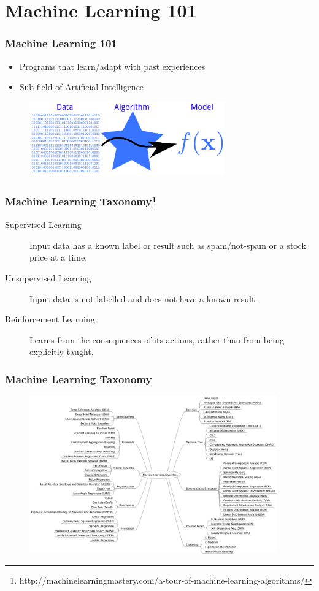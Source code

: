 \documentclass{beamer}
\begin{document}
\section{Machine Learning 101}
\begin{frame}
	\frametitle{Machine Learning 101}
	\begin{itemize}
		\item Programs that learn\slash adapt with past experiences
		\item Sub-field of Artificial Intelligence 
	\end{itemize}
	\begin{figure}
		\centering
		\includegraphics[keepaspectratio, width=0.75\textwidth]{graphics/steps}
	\end{figure}
\end{frame}

\begin{frame}
	\frametitle{Machine Learning Taxonomy\footnote[frame]{http://machinelearningmastery.com/a-tour-of-machine-learning-algorithms/}}
	\begin{description}
		\item[Supervised Learning] Input data has a known label or result such as spam\slash not-spam or a stock price at a time.
		\item[Unsupervised Learning] Input data is not labelled and does not have a known result.
		\item[Reinforcement Learning] Learns from the consequences of its actions, rather than from being explicitly taught. 
	\end{description}
\end{frame}

\begin{frame}
	\frametitle{Machine Learning Taxonomy}
	\begin{figure}
		\centering
		\includegraphics[keepaspectratio, width=0.95\textwidth]{graphics/MachineLearningAlgorithms}
	\end{figure}
\end{frame}
\end{document}
